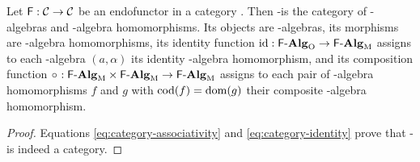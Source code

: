 \begin{definition}

  \label{def:category-alg}

  \index{\alg}

  Let $\mathsf{F}: \mathcal{C} \to \mathcal{C}$ be an endofunctor in a category
  . Then -\alg is the category of -algebras and
  -algebra homomorphisms. Its objects are -algebras,
  its morphisms are -algebra homomorphisms, its identity
  function $\operatorname{id}: \mathcal{\mathsf{F}\text{-}\mathbf{Alg}}_{\operatorname{O}} \to \mathcal{\mathsf{F}\text{-}\mathbf{Alg}}_{\operatorname{M}}$ assigns to each
  -algebra $(a, \alpha)$ its identity -algebra
  homomorphism, and its composition function $\mathrel{\circ}\ : \mathcal{\mathsf{F}\text{-}\mathbf{Alg}}_{\operatorname{M}}
  \times \mathcal{\mathsf{F}\text{-}\mathbf{Alg}}_{\operatorname{M}} \to \mathcal{\mathsf{F}\text{-}\mathbf{Alg}}_{\operatorname{M}}$ assigns to each pair of
  -algebra homomorphisms $f$ and $g$ with $\operatorname{cod}(f) = \operatorname{dom}(g)$
  their composite -algebra homomorphism.

  \begin{proof}
    Equations \eqref{eq:category-associativity} and
    \eqref{eq:category-identity} prove that -\alg is indeed a
    category.
  \end{proof}

\end{definition}


